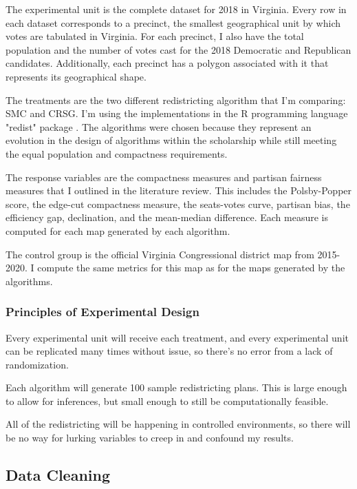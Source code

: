 The experimental unit is the complete dataset for 2018 in Virginia. Every row in each dataset corresponds to a precinct, the smallest geographical unit by which votes are tabulated in Virginia. For each precinct, I also have the total population and the number of votes cast for the 2018 Democratic and Republican candidates. Additionally, each precinct has a polygon associated with it that represents its geographical shape.

The treatments  are the two different redistricting algorithm that I'm comparing: SMC and CRSG. I'm using the implementations in the R programming language "redist" package \parencite{fifield2020d}. The algorithms were chosen because they represent an evolution in the design of algorithms within the scholarship while still meeting the equal population and compactness requirements.

The response variables are the compactness measures and partisan fairness measures that I outlined in the literature review. This includes the Polsby-Popper score, the edge-cut compactness measure, the seats-votes curve, partisan bias, the efficiency gap, declination, and the mean-median difference. Each measure is computed for each map generated by each algorithm.

The control group is the official Virginia Congressional district map from 2015-2020. I compute the same metrics for this map as for the maps generated by the algorithms.

\subsubsection{Principles of Experimental Design}

Every experimental unit will receive each treatment, and every experimental unit can be replicated many times without issue, so there’s no error from a lack of randomization. 

Each algorithm will generate 100 sample redistricting plans. This is large enough to allow for inferences, but small enough to still be computationally feasible. 

All of the redistricting will be happening in controlled environments, so there will be no way for lurking variables to creep in and confound my results. 

\subsection{Data Cleaning}

